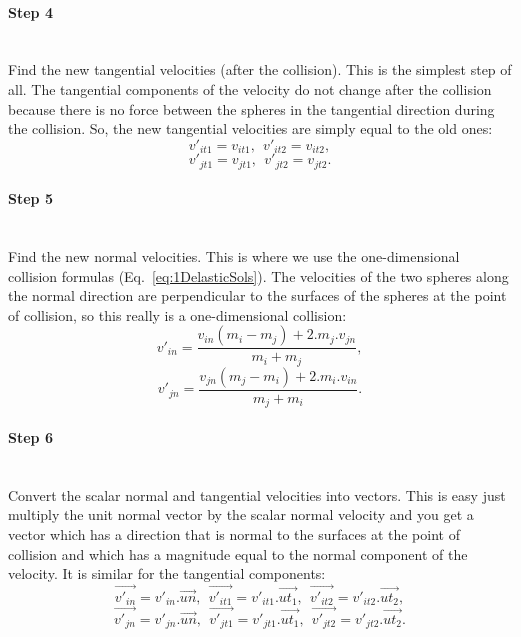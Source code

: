 \paragraph{Step 4}
~\\
Find the new tangential velocities (after the collision). 
This is the simplest step of all. 
The tangential components of the velocity do not change after the collision because there is no force between the spheres in the tangential direction during the collision. 
So, the new tangential velocities are simply equal to the old ones:
\begin{equation*}
	v'_{it1} = v_{it1},~~v'_{it2} = v_{it2},
\end{equation*}
\begin{equation*}
	v'_{jt1} = v_{jt1},~~v'_{jt2} = v_{jt2}.
\end{equation*}

\paragraph{Step 5}
~\\
Find the new normal velocities. 
This is where we use the one-dimensional collision formulas (Eq.~\ref{eq:1DelasticSols}).
The velocities of the two spheres along the normal direction are perpendicular to the surfaces
of the spheres at the point of collision, so this really is a one-dimensional collision:
\begin{equation*}
	v'_{in} = \frac{v_{in}(m_i-m_j) + 2.m_j.v_{jn}}{m_i + m_j},
\end{equation*}
\begin{equation*}
	v'_{jn} = \frac{v_{jn}(m_j-m_i) + 2.m_i.v_{in}}{m_j + m_i}.
\end{equation*}

\paragraph{Step 6}
~\\
Convert the scalar normal and tangential velocities into vectors. 
This is easy just multiply the unit normal vector by the scalar normal velocity and you get a vector which has a direction that is normal to the surfaces at the point of collision and which has a magnitude equal to the normal component of the velocity. 
It is similar for the tangential components:
\begin{equation*}
	\vec{v'_{in}} = v'_{in} . \vec{un},~~\vec{v'_{it1}} = v'_{it1} . \vec{ut_1},~~\vec{v'_{it2}} = v'_{it2} . \vec{ut_2},
\end{equation*}
\begin{equation*}
	\vec{v'_{jn}} = v'_{jn} . \vec{un},~~\vec{v'_{jt1}} = v'_{jt1} . \vec{ut_1},~~\vec{v'_{jt2}} = v'_{jt2} . \vec{ut_2}.
\end{equation*}

